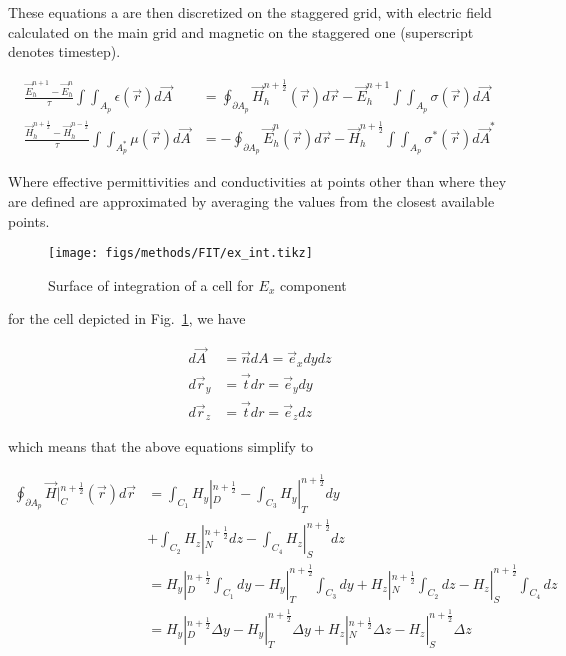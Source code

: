     These equations a are then discretized on the staggered grid, with electric field calculated on the main
    grid and magnetic on the staggered one (superscript denotes timestep).

    \begin{align}
        \frac{\vec{E}_h^{n+1} - \vec{E}_h^{n}}{\tau}\int\int_{A_p}\epsilon(\vec{r})d\vec{A}
            &= \oint_{\partial A_p}\vec{H}_h^{n+\frac{1}{2}}(\vec{r})d\vec{r} - \vec{E}_h^{n+1}\int\int_{A_p}\sigma(\vec{r})d\vec{A} \\
        \frac{\vec{H}_h^{n+\frac{1}{2}} - \vec{H}_h^{n-\frac{1}{2}}}{\tau} \int\int_{A_p^*}\mu(\vec{r})d\vec{A}
            &= - \oint_{\partial A_p}\vec{E}_h^{n}(\vec{r})d\vec{r} - \vec{H}_h^{n+\frac{1}{2}}\int\int_{A_p}\sigma^*(\vec{r})d\vec{A}^*
    \end{align}

    Where effective permittivities and conductivities at points other than where they are defined are
    approximated by averaging the values from the closest available points.

    \begin{figure}[!ht]
        \centering
        \texttt{[image: figs/methods/FIT/ex\_int.tikz]}
        \caption{Surface of integration of a cell for $E_x$ component}
        \label{fig:Ex_Int}
    \end{figure}

    for the cell depicted in Fig.~\ref{fig:Ex_Int}, we have

    \begin{align}
        d\vec{A} &= \vec{n}dA = \vec{e}_xdydz \\
        d\vec{r}_y &= \vec{t}dr = \vec{e}_ydy \\
        d\vec{r}_z &= \vec{t}dr = \vec{e}_zdz
    \end{align}

    which means that the above equations simplify to

    \begin{align}
        \oint_{\partial A_p} \vec{H}|^{n+\frac{1}{2}}_{C}(\vec{r})d\vec{r} &= \int_{C_1}H_y|_D^{n+\frac{1}{2}} - \int_{C_3} H_y|_T^{n+\frac{1}{2}}dy \\
        &+\int_{C_2}H_z|_{N}^{n+\frac{1}{2}}dz - \int_{C_4}H_z|_{S}^{n+\frac{1}{2}}dz \\
        &= H_y|_D^{n+\frac{1}{2}}\int_{C_1}dy - H_y|_T^{n+\frac{1}{2}} \int_{C_3} dy +H_z|_{N}^{n+\frac{1}{2}}\int_{C_2}dz - H_z|_{S}^{n+\frac{1}{2}}\int_{C_4}dz\\
        &= H_y|_D^{n+\frac{1}{2}}\Delta y - H_y|_T^{n+\frac{1}{2}} \Delta y +H_z|_{N}^{n+\frac{1}{2}}\Delta z - H_z|_{S}^{n+\frac{1}{2}}\Delta z\\
    \end{align}


